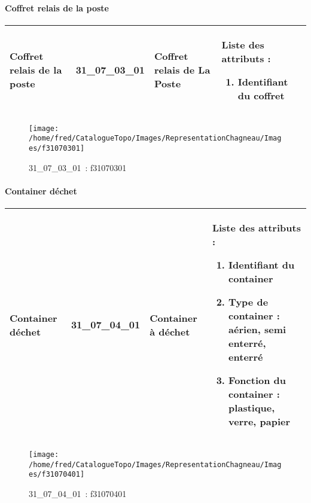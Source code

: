 \documentclass[12pt,titlepage]{book}
\begin{document}
\paragraph{Coffret relais de la poste}
\noindent
\vspace{\baselineskip}

\renewcommand{\arraystretch}{1.2}
\begin{supertabular}{|p{10cm}|c|p{13cm}|p{12cm}|}
 Coffret relais de la poste & 31\_07\_03\_01 & Coffret relais de La Poste & Liste des attributs :
\begin{enumerate}
  \item Identifiant du coffret\end{enumerate}
\\
\hline
\end{supertabular}
\begin{figure}[h!]
  \hfill         %
  \begin{minipage}[t]{3cm}
    \begin{center}
      \texttt{[image: /home/fred/CatalogueTopo/Images/RepresentationChagneau/Images/f31070301]}
      \caption[~31\_07\_03\_01]{\small{31\_07\_03\_01~:} \tiny{f31070301}}\label{f31070301}
    \end{center}
  \end{minipage}
\end{figure}


\paragraph{Container déchet}
\noindent
\vspace{\baselineskip}

\renewcommand{\arraystretch}{1.2}
\begin{supertabular}{|p{10cm}|c|p{13cm}|p{12cm}|}
 Container déchet & 31\_07\_04\_01 & Container à déchet & Liste des attributs :
\begin{enumerate}
  \item Identifiant du container  \item Type de container : aérien, semi enterré, enterré  \item Fonction du container : plastique, verre, papier\end{enumerate}
\\
\hline
\end{supertabular}
\begin{figure}[h!]
  \hfill         %
  \begin{minipage}[t]{3cm}
    \begin{center}
      \texttt{[image: /home/fred/CatalogueTopo/Images/RepresentationChagneau/Images/f31070401]}
      \caption[~31\_07\_04\_01]{\small{31\_07\_04\_01~:} \tiny{f31070401}}\label{f31070401}
    \end{center}
  \end{minipage}
\end{figure}
\end{document}
